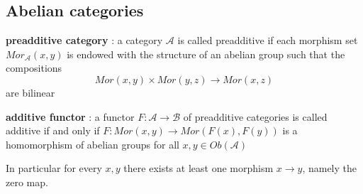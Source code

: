 \documentclass{article}
\begin{document}
\newpage
\subsection{Abelian categories}

\textbf{preadditive category} : a category $\mathscr A$ is called preadditive if each morphism set $Mor_\mathscr A (x,y)$ is endowed with the structure of an abelian group such that the compositions
$$
Mor(x,y)\times Mor(y,z)
\rightarrow Mor(x,z)
$$
are bilinear


\textbf{additive functor} : a functor $F:\mathscr A\rightarrow \mathscr B$ of preadditive categories is called additive if and only if $F:Mor(x,y)\rightarrow Mor(F(x),F(y))$ is a homomorphism of abelian groups for all $x,y\in Ob(\mathscr A)$

In particular for every $x,y$ there exists at least one morphism $x\rightarrow y$, namely the zero map. 
\end{document}
